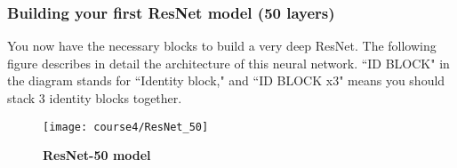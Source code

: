 \subsubsection{Building your first ResNet model (50 layers)}

You now have the necessary blocks to build a very deep ResNet. The following figure describes in detail the architecture of this neural network. ``ID BLOCK" in the diagram stands for ``Identity block," and ``ID BLOCK x3" means you should stack 3 identity blocks together.
\begin{figure}[h]
\begin{center}
\texttt{[image: course4/ResNet\_50]}
\caption{{\textbf{ResNet-50 model}}}
\end{center}
\end{figure}

